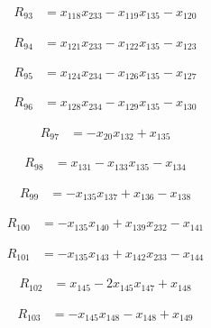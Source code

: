 \begin{align*}
R_{93} &= x_{118} x_{233} -x_{119} x_{135} -x_{120}
\end{align*}

\begin{align*}
R_{94} &= x_{121} x_{233} -x_{122} x_{135} -x_{123}
\end{align*}

\begin{align*}
R_{95} &= x_{124} x_{234} -x_{126} x_{135} -x_{127}
\end{align*}

\begin{align*}
R_{96} &= x_{128} x_{234} -x_{129} x_{135} -x_{130}
\end{align*}

\begin{align*}
R_{97} &= -x_{20} x_{132} +x_{135}
\end{align*}

\begin{align*}
R_{98} &= x_{131} -x_{133} x_{135} -x_{134}
\end{align*}

\begin{align*}
R_{99} &= -x_{135} x_{137} +x_{136} -x_{138}
\end{align*}

\begin{align*}
R_{100} &= -x_{135} x_{140} +x_{139} x_{232} -x_{141}
\end{align*}

\begin{align*}
R_{101} &= -x_{135} x_{143} +x_{142} x_{233} -x_{144}
\end{align*}

\begin{align*}
R_{102} &= x_{145} -2 x_{145} x_{147} +x_{148}
\end{align*}

\begin{align*}
R_{103} &= -x_{145} x_{148} -x_{148} +x_{149}
\end{align*}

